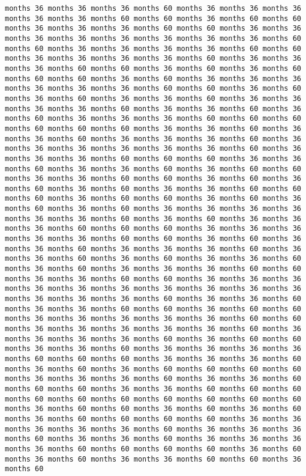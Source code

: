 \documentclass[11pt]{article}
\begin{document}
\begin{Verbatim}[commandchars=\\\{\}, frame=single, framerule=2mm, rulecolor=\color{outerrorbackground}]
months 36 months 36 months 36 months 60 months 36 months 36 months 36 months 36 months 36 months 60 months 60 months 36 months 60 months 60 months 36 months 36 months 36 months 60 months 60 months 36 months 36 months 36 months 36 months 36 months 36 months 36 months 36 months 60 months 60 months 36 months 36 months 36 months 36 months 60 months 60 months 36 months 36 months 36 months 36 months 60 months 36 months 36 months 36 months 60 months 60 months 36 months 60 months 36 months 60 months 60 months 60 months 36 months 60 months 36 months 36 months 36 months 36 months 36 months 36 months 60 months 60 months 36 months 60 months 36 months 60 months 36 months 36 months 60 months 36 months 36 months 36 months 36 months 60 months 36 months 36 months 60 months 36 months 60 months 36 months 36 months 36 months 60 months 60 months 60 months 60 months 60 months 60 months 36 months 36 months 60 months 36 months 36 months 60 months 36 months 36 months 36 months 60 months 36 months 36 months 36 months 36 months 36 months 36 months 60 months 36 months 36 months 36 months 60 months 60 months 60 months 36 months 36 months 60 months 36 months 36 months 60 months 36 months 60 months 60 months 36 months 36 months 60 months 60 months 36 months 60 months 36 months 60 months 36 months 60 months 36 months 36 months 60 months 60 months 60 months 36 months 60 months 60 months 36 months 60 months 36 months 60 months 36 months 60 months 36 months 36 months 36 months 36 months 36 months 36 months 60 months 36 months 60 months 36 months 36 months 36 months 60 months 60 months 60 months 36 months 36 months 36 months 36 months 36 months 60 months 60 months 36 months 60 months 36 months 36 months 60 months 36 months 36 months 36 months 60 months 36 months 36 months 60 months 36 months 60 months 36 months 36 months 60 months 36 months 60 months 36 months 36 months 36 months 60 months 60 months 36 months 36 months 60 months 60 months 36 months 36 months 36 months 36 months 36 months 36 months 36 months 36 months 36 months 36 months 36 months 36 months 36 months 60 months 36 months 36 months 60 months 36 months 36 months 60 months 60 months 36 months 60 months 60 months 36 months 36 months 36 months 36 months 36 months 60 months 60 months 36 months 36 months 36 months 36 months 36 months 60 months 36 months 36 months 36 months 36 months 60 months 36 months 60 months 60 months 36 months 36 months 60 months 36 months 36 months 36 months 36 months 60 months 60 months 60 months 36 months 36 months 36 months 60 months 36 months 60 months 36 months 60 months 60 months 60 months 60 months 36 months 36 months 36 months 60 months 36 months 36 months 60 months 60 months 60 months 36 months 36 months 60 months 60 months 60 months 60 months 60 months 60 months 60 months 60 months 60 months 60 months 36 months 60 months 60 months 36 months 60 months 36 months 60 months 36 months 60 months 60 months 60 months 60 months 36 months 36 months 36 months 36 months 36 months 60 months 36 months 36 months 36 months 60 months 36 months 36 months 60 months 36 months 36 months 36 months 36 months 60 months 60 months 60 months 60 months 36 months 60 months 36 months 60 months 36 months 36 months 60 months 60 months 36 months 60 
\end{Verbatim}
\end{document}
